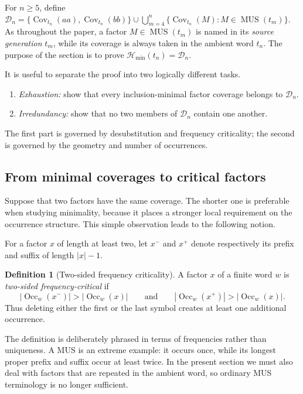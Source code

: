 \documentclass[11pt,a4paper]{article}
\theoremstyle{definition}\newtheorem{definition}[theorem]{Definition}
\theoremstyle{remark}\newtheorem{remark}[theorem]{Remark}
\newcommand{\Occ}{\operatorname{Occ}}
\newcommand{\Cov}{\operatorname{Cov}}
\newcommand{\MUS}{\operatorname{MUS}}
\newcommand{\Hmin}{\mathcal{H}_{\min}}
\begin{document}
For $n\ge5$, define
$
 \mathcal D_n=
 \{\Cov_{t_n}(aa),\Cov_{t_n}(bb)\}
 \cup
 \bigcup_{m=4}^{n}
 \{\Cov_{t_n}(M):M\in\MUS(t_m)\}.
$
As throughout the paper, a factor $M\in\MUS(t_m)$ is named in its \emph{source generation} $t_m$, while its coverage is always taken in the ambient word $t_n$.  The purpose of the section is to prove
$
 \Hmin(t_n)=\mathcal D_n.
$

It is useful to separate the proof into two logically different tasks.
\begin{enumerate}[label=(\arabic*),leftmargin=*]
\item \emph{Exhaustion:} show that every inclusion-minimal factor coverage belongs to $\mathcal D_n$.
\item \emph{Irredundancy:} show that no two members of $\mathcal D_n$ contain one another.
\end{enumerate}
The first part is governed by desubstitution and frequency criticality; the second is governed by the geometry and number of occurrences.

\subsection{From minimal coverages to critical factors}
\label{subsec:critical-representatives}

Suppose that two factors have the same coverage.  The shorter one is preferable when studying minimality, because it places a stronger local requirement on the occurrence structure.  This simple observation leads to the following notion.

For a factor $x$ of length at least two, let $x^-$ and $x^+$ denote respectively its prefix and suffix of length $|x|-1$.

\begin{definition}[Two-sided frequency criticality]
A factor $x$ of a finite word $w$ is \emph{two-sided frequency-critical} if
\[
 |\Occ_w(x^-)|>|\Occ_w(x)|
 \qquad\text{and}\qquad
 |\Occ_w(x^+)|>|\Occ_w(x)|.
\]
Thus deleting either the first or the last symbol creates at least one additional occurrence.
\end{definition}

The definition is deliberately phrased in terms of frequencies rather than uniqueness.  A MUS is an extreme example: it occurs once, while its longest proper prefix and suffix occur at least twice.  In the present section we must also deal with factors that are repeated in the ambient word, so ordinary MUS terminology is no longer sufficient.
\end{document}

